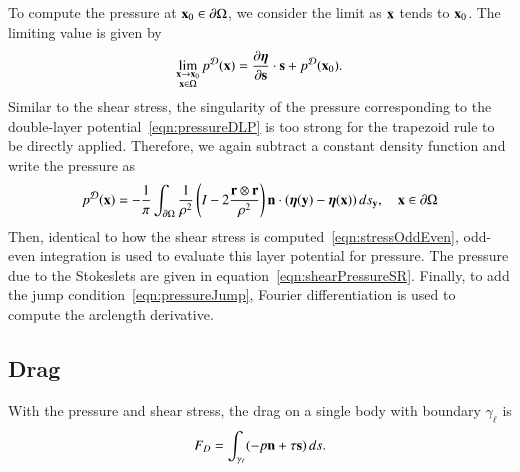 \documentclass[preprint, 10pt]{elsarticle}
\begin{document}
To compute the pressure at ${\mathbf{x}}_0 \in {\partial}\Omega$, we consider the limit
as ${\mathbf{x}}$ tends to ${\mathbf{x}}_0$.  The limiting value is given
by~\cite{qua-bir2014a}
\begin{align}
  \lim_{\substack{{\mathbf{x}} \rightarrow {\mathbf{x}}_0 \\ {\mathbf{x}} \in \Omega}}p^{\mathcal{D}}({\mathbf{x}}) =  
    \frac{\partial {\boldsymbol\eta}}{\partial {\mathbf{s}}} \cdot {\mathbf{s}} + p^{{\mathcal{D}}}({\mathbf{x}}_0).
  \label{eqn:pressureJump}
\end{align}
Similar to the shear stress, the singularity of the pressure
corresponding to the double-layer potential~\eqref{eqn:pressureDLP} is
too strong for the trapezoid rule to be directly applied.  Therefore, we
again subtract a constant density function and write the pressure as
\begin{align*}
  p^{\mathcal{D}}({\mathbf{x}}) = -\frac{1}{\pi}\int_{{\partial}\Omega} \frac{1}{\rho^2}
    \left(I - 2 \frac{{\mathbf{r}} \otimes {\mathbf{r}}}{\rho^2}\right) 
    {\mathbf{n}} \cdot ({\boldsymbol\eta}({\mathbf{y}}) - {\boldsymbol\eta}({\mathbf{x}})) \,ds_{\mathbf{y}}, 
    \quad {\mathbf{x}} \in {\partial}\Omega
\end{align*}
Then, identical to how the shear stress is
computed~\eqref{eqn:stressOddEven}, odd-even integration is used to
evaluate this layer potential for pressure.  The pressure due to the
Stokeslets are given in equation~\eqref{eqn:shearPressureSR}.  Finally,
to add the jump condition~\eqref{eqn:pressureJump}, Fourier
differentiation is used to compute the arclength derivative. 


\subsection{Drag}
\label{sec:drag}
With the pressure and shear stress, the drag on a single body with
boundary $\gamma_\ell$ is
\begin{align}
  F_D = \int_{\gamma_\ell} (-p {\mathbf{n}} + \tau {\mathbf{s}})\,ds.
  \label{eqn:drag}
\end{align}

\end{document}
